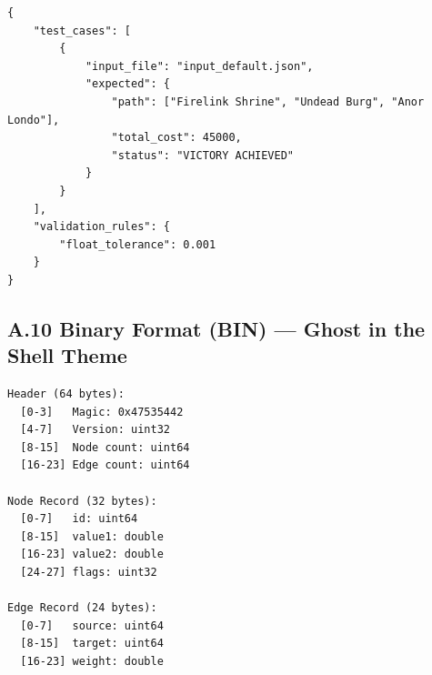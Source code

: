 \begin{lstlisting}[style=json, caption={data/expected\_output.json}]
{
    "test_cases": [
        {
            "input_file": "input_default.json",
            "expected": {
                "path": ["Firelink Shrine", "Undead Burg", "Anor Londo"],
                "total_cost": 45000,
                "status": "VICTORY ACHIEVED"
            }
        }
    ],
    "validation_rules": {
        "float_tolerance": 0.001
    }
}
\end{lstlisting}

\subsection*{A.10 Binary Format (BIN) --- Ghost in the Shell Theme}

\begin{lstlisting}[style=plaintext, caption={Binary format specification}]
Header (64 bytes):
  [0-3]   Magic: 0x47535442
  [4-7]   Version: uint32
  [8-15]  Node count: uint64
  [16-23] Edge count: uint64

Node Record (32 bytes):
  [0-7]   id: uint64
  [8-15]  value1: double
  [16-23] value2: double
  [24-27] flags: uint32

Edge Record (24 bytes):
  [0-7]   source: uint64
  [8-15]  target: uint64
  [16-23] weight: double
\end{lstlisting}
